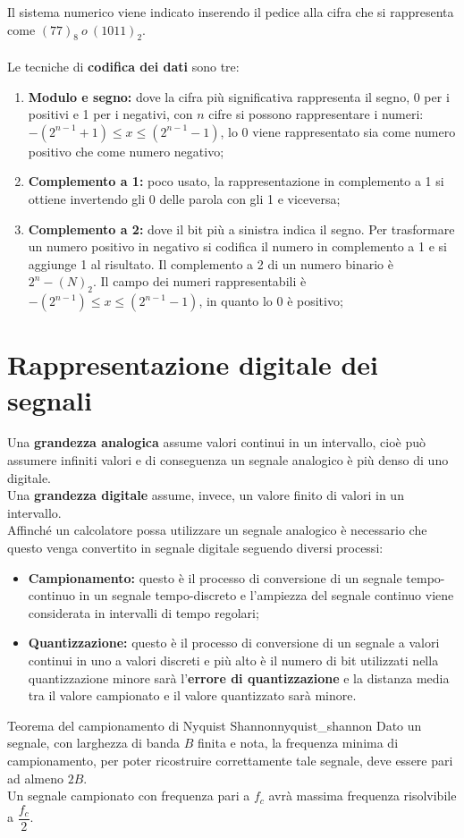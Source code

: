 \documentclass[12pt]{report}
\newcounter{theorem}
\newcommand{\nmu}{}
\begin{document}
		Il sistema numerico viene indicato inserendo il pedice alla cifra che si rappresenta come $(77)_8 \ o \ (1011)_2$.
		\\
		\\
		Le tecniche di \textbf{codifica dei dati} sono tre:
		\begin{enumerate}
			\item \textbf{Modulo e segno:} dove la cifra più significativa rappresenta il segno, 0 per i positivi e 1 per i negativi, con $n$ cifre si possono rappresentare i numeri: $-(2^{n-1}+1) \leq x \leq (2^{n-1} - 1)$, lo $0$ viene rappresentato sia come numero positivo che come numero negativo;
			\item \textbf{Complemento a 1:} poco usato, la rappresentazione in complemento a 1 si ottiene invertendo gli 0 delle parola con gli 1 e viceversa;
			\item \textbf{Complemento a 2:} dove il bit più a sinistra indica il segno. Per trasformare un numero positivo in negativo si codifica il numero in complemento a 1 e si aggiunge 1 al risultato.
			Il complemento a 2 di un numero binario è $2^n-(N)_2$.
			Il campo dei numeri rappresentabili è $-(2^{n-1}) \leq x \leq (2^{n-1} - 1)$, in quanto lo $0$ è positivo;
		\end{enumerate}
		\section{Rappresentazione digitale dei segnali}
		Una \textbf{grandezza analogica} assume valori continui in un intervallo, cioè può assumere infiniti valori e di conseguenza un segnale analogico è più denso di uno digitale.
		\\
		Una \textbf{grandezza digitale} assume, invece, un valore finito di valori in un intervallo.
		\\
		Affinché un calcolatore possa utilizzare un segnale analogico è necessario che questo venga convertito in segnale digitale seguendo diversi processi:
		\begin{itemize}
			\item \textbf{Campionamento:} questo è il processo di conversione di un segnale tempo-continuo in un segnale tempo-discreto e l'ampiezza del segnale continuo viene considerata in intervalli di tempo regolari;
			\item \textbf{Quantizzazione:} questo è il processo di conversione di un segnale a valori continui in uno a valori discreti e più alto è il numero di bit utilizzati nella quantizzazione minore sarà l'\textbf{errore di quantizzazione} e la distanza media tra il valore campionato e il valore quantizzato sarà minore.
		\end{itemize}
		\begin{theorem}{\nmu Teorema del campionamento di Nyquist Shannon}{nyquist_shannon}
			Dato un segnale, con larghezza di banda $B$ finita e nota, la frequenza minima di campionamento, per poter ricostruire correttamente tale segnale, deve essere pari ad almeno $2B$.
			\\
			Un segnale campionato con frequenza pari a $f_c$ avrà massima frequenza risolvibile a $\dfrac{f_c}{2}$.
		\end{theorem}
\end{document}
